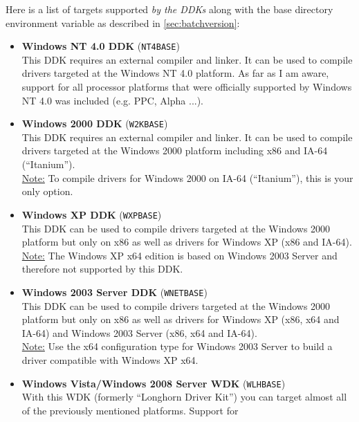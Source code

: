 \documentclass[a4paper,titlepage]{report}
\begin{document}
\begin{itemize}
        Here is a list of targets supported \emph{by the DDKs} along with the base directory
        environment variable as described in \autoref{sec:batchversion}:
        \begin{itemize}
          \item
            \textbf{Windows NT 4.0 DDK} (\texttt{NT4BASE})\\
            This DDK requires an external compiler and linker. It can be used to compile
            drivers targeted at the Windows NT 4.0 platform. As far as I am aware,
            support for all processor platforms that were officially supported by
            Windows NT 4.0 was included (e.g. PPC, Alpha ...).
          \item
            \textbf{Windows 2000 DDK} (\texttt{W2KBASE})\\
            This DDK requires an external compiler and linker. It can be used to compile
            drivers targeted at the Windows 2000 platform including x86 and IA-64 (``Itanium'').\\
            \underline{Note:} To compile drivers for Windows 2000 on IA-64 (``Itanium''),
            this is your only option.
          \item
            \textbf{Windows XP DDK} (\texttt{WXPBASE})\\
            This DDK can be used to compile drivers targeted at the Windows 2000 platform
            but only on x86 as well as drivers for Windows XP (x86 and IA-64).\\
            \underline{Note:} The Windows XP x64 edition is based on Windows 2003 Server
            and therefore not supported by this DDK.
          \item
            \textbf{Windows 2003 Server DDK} (\texttt{WNETBASE})\\
            This DDK can be used to compile drivers targeted at the Windows 2000 platform
            but only on x86 as well as drivers for Windows XP (x86, x64 and IA-64)
            and Windows 2003 Server (x86, x64 and IA-64).\\
            \underline{Note:} Use the x64 configuration type for Windows 2003 Server to
            build a driver compatible with Windows XP x64.
          \item
            \textbf{Windows Vista/Windows 2008 Server WDK} (\texttt{WLHBASE})\\
            With this WDK (formerly ``Longhorn Driver Kit'')
            you can target almost all of the previously mentioned platforms. Support for

\end{itemize}
\end{itemize}
\end{document}
